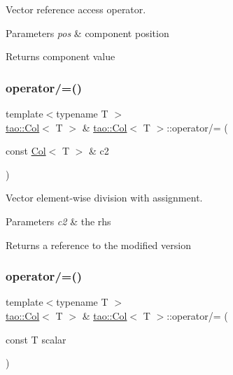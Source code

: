 Vector reference access operator. 


\begin{DoxyParams}{Parameters}
{\em pos} & component position \\
\hline
\end{DoxyParams}
\begin{DoxyReturn}{Returns}
component value 
\end{DoxyReturn}
\mbox{\label{classtao_1_1_col_ab51f1d091fdb1b5a6a4199f4253ecfaa}} 
\subsubsection{\texorpdfstring{operator/=()}{operator/=()}\hspace{0.1cm}{\footnotesize\ttfamily [1/2]}}
{\footnotesize\ttfamily template$<$typename T $>$ \\
\mbox{\hyperlink{classtao_1_1_col}{tao\+::\+Col}}$<$ T $>$ \& \mbox{\hyperlink{classtao_1_1_col}{tao\+::\+Col}}$<$ T $>$\+::operator/= (\begin{DoxyParamCaption}\item[{const \mbox{\hyperlink{classtao_1_1_col}{Col}}$<$ T $>$ \&}]{c2 }\end{DoxyParamCaption})}



Vector element-\/wise division with assignment. 


\begin{DoxyParams}{Parameters}
{\em c2} & the rhs \\
\hline
\end{DoxyParams}
\begin{DoxyReturn}{Returns}
a reference to the modified version 
\end{DoxyReturn}
\mbox{\label{classtao_1_1_col_abddd1e9737a0cafd50a52fd5063e4851}} 
\subsubsection{\texorpdfstring{operator/=()}{operator/=()}\hspace{0.1cm}{\footnotesize\ttfamily [2/2]}}
{\footnotesize\ttfamily template$<$typename T $>$ \\
\mbox{\hyperlink{classtao_1_1_col}{tao\+::\+Col}}$<$ T $>$ \& \mbox{\hyperlink{classtao_1_1_col}{tao\+::\+Col}}$<$ T $>$\+::operator/= (\begin{DoxyParamCaption}\item[{const T}]{scalar }\end{DoxyParamCaption})}



